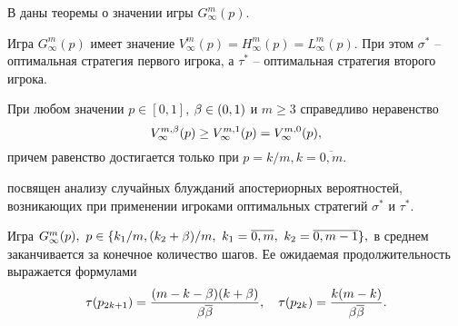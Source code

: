 В  даны теоремы о значении игры $G^m_\infty(p)$.
\begin{theorem}
  Игра $G^m_\infty(p)$ имеет значение $V^m_\infty(p) = H^m_\infty(p) = L^m_\infty(p)$.
  При этом $\sigma^*$ -- оптимальная стратегия первого игрока\textup{,} а $\tau^*$ -- оптимальная стратегия второго игрока.
\end{theorem}

\begin{theorem}
  При любом значении $p \in [0,1]$, $\beta \in (0,1)$ и $m \geq 3$ справедливо неравенство
  \begin{equation*}
    V^{m, \beta}_\infty(p) \geq V^{m,1}_\infty(p) = V^{m,0}_\infty(p),
  \end{equation*}
  причем равенство достигается только при $p = k/m, k = \overline{0,m}$.
\end{theorem}

 посвящен анализу случайных блужданий апостериорных вероятностей, возникающих при применении игроками оптимальных стратегий $\sigma^*$ и $\tau^*$.

\begin{theorem}
  Игра $G^m_\infty(p),\ p \in \{k_1/m, (k_2+\beta)/m,\ k_1 = \overline{0,m},\ k_2 = \overline{0,m-1}\},$ в среднем заканчивается за конечное количество шагов.
  Ее ожидаемая продолжительность выражается формулами
  \begin{equation*} 
    \tau(p_{2k+1}) = \frac{(m-k-\beta)(k+\beta)}{\beta {\overline{\beta}}},\quad
    \tau(p_{2k}) = \frac{k(m-k)}{\beta {\overline{\beta}}}.
  \end{equation*}
\end{theorem}


